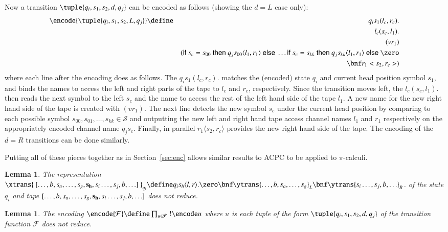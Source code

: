 \documentclass[submission,copyright,creativecommons]{eptcs}
\newtheorem{lemma}[theorem]{Lemma}
\newcommand{\tape}[1]{[#1]}
\begin{document}
Now a transition $\tuple{q_i, s_1, s_2, d, q_j}$ can be encoded as follows
(showing the $d=L$ case only):
\begin{eqnarray*}
\encode{\tuple{q_i, s_1, s_2, L, q_j}} &\define&
 q_i s_1 ( l_c, r_c ) .\\
& & l_c ( s_c, l_1 ) .\\
& &  (v r_1)\\
& & (\ifte {s_c} {s_{00}} {q_j s_{00}\langle l_1, r_1\rangle} {}\hdots
\ifte {s_c} {s_{kk}} {q_j s_{kk}\langle l_1, r_1\rangle} \zero\\
& & \bnf r_1 < s_2, r_c >)
\end{eqnarray*}
where each line after the encoding does as follows.
The $q_i s_1 ( l_c, r_c ) .$ matches the (encoded) state $q_i$ and current head position symbol $s_1$,
and binds the names
to access the left and right parts of the tape to $l_c$ and $r_c$, respectively.
Since the transition moves left, the $l_c ( s_c, l_1 ) .$ then reads the next symbol to the
left $s_c$ and the name to access the rest of the left hand side of the tape $l_1$.
A new name for the new right hand side of the tape is created with $(v r_1)$.
The next
line detects
the new symbol $s_c$ under the current head position by
comparing to each possible symbol $s_{00},s_{01},\ldots,s_{kk}\in{\mathcal S}$ and
outputting the new left and right hand tape access channel names $l_1$ and $r_1$ respectively
on the appropriately encoded channel name $q_j s_c$.
Finally, in parallel $r_1 \langle s_2, r_c \rangle$ provides the new right hand side of the tape.
The encoding of the $d=R$ transitions can be done similarly.

Putting all of these pieces together as in Section~\ref{sec:enc} allows similar results
to ACPC to be applied to $\pi$-calculi.

\begin{lemma}
\label{lem:tape-no-red-pi}
The representation
$\xtrans{\ \tape{\ldots,b,s_a,\ldots,s_g,{\bf s_h},s_i\ldots,s_j,b,\ldots}\ }_{q_i}
\define q_i s_h\langle l,r\rangle.\zero \bnf
\ytrans{\ldots,b,s_a,\ldots,s_g}_L\bnf
\ytrans {s_i\ldots,s_j,b,\ldots}_R$.
of the state $q_i$ and tape $\tape{\ldots,b,s_a,\ldots,s_g,{\bf s_h},s_i\ldots,s_j,b,\ldots}$
does not reduce.
\end{lemma}

\begin{lemma}
\label{lem:trans-no-red-pi}
The encoding $\encode{\mathcal F} \define \prod _{u\in{\mathcal F}} \ !\encode u$
where $u$ is each tuple of the form $\tuple {q_i,s_1,s_2,d,q_j}$
of the transition function ${\mathcal F}$
does not reduce.
\end{lemma}
\end{document}
